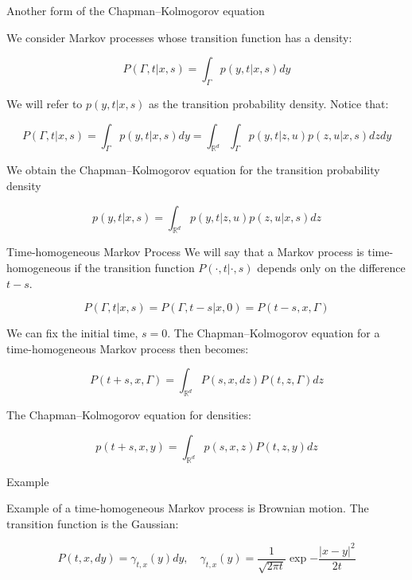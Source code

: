 \documentclass{beamer}%
\theoremstyle{definition}
\newcommand{\R}{\mathbb{R}}
\begin{document}
\begin{frame}{Another form of the Chapman–Kolmogorov equation
}

We consider Markov processes whose transition function has a
density:

\[P(\Gamma, t|x, s) = \int_{\Gamma} p(y, t|x, s) dy\]

We will refer to $p(y,t|x,s)$ as the transition probability density. Notice that: 

\[P(\Gamma, t|x, s) = \int_{\Gamma} p(y, t|x, s) dy = \int_{\R^d}\int_{\Gamma} p(y, t|z, u) p(z, u|x, s)dz dy\]

We obtain the Chapman–Kolmogorov equation
for the transition probability density

\[p(y, t|x, s) = \int_{\R^d} p(y, t|z, u) p(z, u|x, s)dz\]
    
\end{frame}

\begin{frame}{Time-homogeneous Markov Process}
We will say that a Markov process is time-homogeneous if the transition function $P(\cdot, t|\cdot, s)$
depends only on the difference $t - s$.

\[P(\Gamma, t|x, s) = P(\Gamma, t - s| x, 0) = P(t - s, x, \Gamma)\]

We can fix
the initial time, $s = 0$. The Chapman–Kolmogorov equation for a time-homogeneous
Markov process then becomes:

\[P(t + s, x, \Gamma) = \int_{\R^d} P(s, x, dz) P(t, z, \Gamma)dz\]

The Chapman–Kolmogorov equation for densities:

\[p(t + s, x, y) = \int_{\R^d} p(s, x, z) P(t, z, y)dz\]

    
\end{frame}


\begin{frame}{Example}

\begin{example}
Example of a time-homogeneous Markov process is Brownian motion. The transition
function is the Gaussian:

\[P(t, x, dy) = \gamma_{t, x}(y) dy, \quad \gamma_{t, x}(y) = \frac{1}{\sqrt{2\pi t}} \exp{-\frac{|x-y|^2}{2t}}\]

\end{example}

\end{frame}
\end{document}
